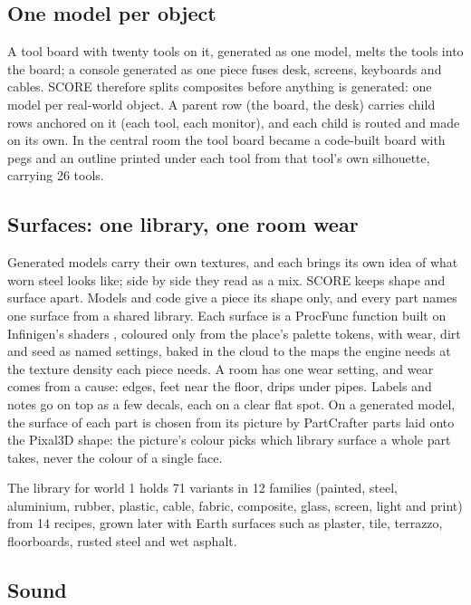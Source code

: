 \subsection{One model per object}\label{one-model-per-object}

A tool board with twenty tools on it, generated as one model, melts the tools into the board; a console generated as one piece fuses desk, screens, keyboards and cables. SCORE therefore splits composites before anything is generated: one model per real-world object. A parent row (the board, the desk) carries child rows anchored on it (each tool, each monitor), and each child is routed and made on its own. In the central room the tool board became a code-built board with pegs and an outline printed under each tool from that tool's own silhouette, carrying 26 tools.

\subsection{Surfaces: one library, one room wear}\label{surfaces-one-library-one-room-wear}

Generated models carry their own textures, and each brings its own idea of what worn steel looks like; side by side they read as a mix. SCORE keeps shape and surface apart. Models and code give a piece its shape only, and every part names one surface from a shared library. Each surface is a ProcFunc function \citep{raistrick2026procfunc} built on Infinigen's shaders \citep{raistrick2023infinigen}, coloured only from the place's palette tokens, with wear, dirt and seed as named settings, baked in the cloud to the maps the engine needs at the texture density each piece needs. A room has one wear setting, and wear comes from a cause: edges, feet near the floor, drips under pipes. Labels and notes go on top as a few decals, each on a clear flat spot. On a generated model, the surface of each part is chosen from its picture by PartCrafter parts \citep{lin2025partcrafter} laid onto the Pixal3D shape: the picture's colour picks which library surface a whole part takes, never the colour of a single face.

The library for world 1 holds 71 variants in 12 families (painted, steel, aluminium, rubber, plastic, cable, fabric, composite, glass, screen, light and print) from 14 recipes, grown later with Earth surfaces such as plaster, tile, terrazzo, floorboards, rusted steel and wet asphalt.

\subsection{Sound}\label{sound}

